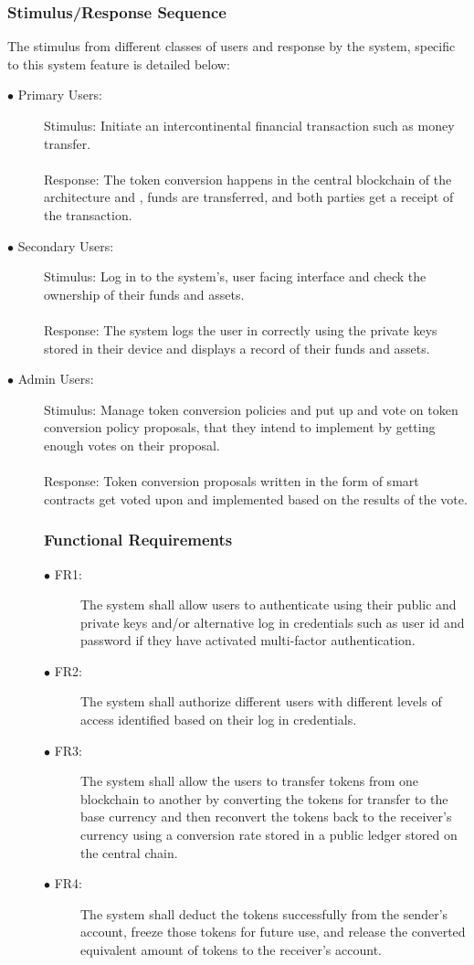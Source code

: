 \documentclass[a4paper,twoside,phd]{BYUPhys}
\begin{document}
\subsubsection{Stimulus/Response Sequence}
The stimulus from different classes of users and response by the system, specific to this system feature is detailed below:
\begin{description}
\item[$\bullet$ Primary Users:] Stimulus: Initiate an intercontinental financial transaction such as money transfer.
\\
\\
Response: The token conversion happens in the central blockchain of the architecture and , funds are transferred, and both parties get a receipt of the transaction.
\item[$\bullet$ Secondary Users:]
Stimulus: Log in to the system's, user facing interface and check the ownership of their funds and assets.
\\
\\
Response: The system logs the user in correctly using the private keys stored in their device and displays a record of their funds and assets.
\item[$\bullet$ Admin Users:] Stimulus: Manage token conversion policies and put up and vote on token conversion policy proposals, that they intend to implement by getting enough votes on their proposal.
\\
\\
Response: Token conversion proposals written in the form of smart contracts get voted upon and implemented based on the results of the vote.
\subsubsection{Functional Requirements}
\begin{description}
\item[$\bullet$ FR1:] The system shall allow users to authenticate using their public and private keys and/or alternative log in credentials such as user id and password if they have activated multi-factor authentication.
\item[$\bullet$ FR2:] The system shall authorize different users with different levels of access identified based on their log in credentials.
\item[$\bullet$ FR3:] The system shall allow the users to transfer tokens from one blockchain to another by converting the tokens for transfer to the base currency and then reconvert the tokens back to the receiver's currency using a conversion rate stored in a public ledger stored on the central chain.
\item[$\bullet$ FR4:] The system shall deduct the tokens successfully from the sender's account, freeze those tokens for future use, and release the converted equivalent amount of tokens to the receiver's account.
\end{description}
\end{description}
\end{document}
